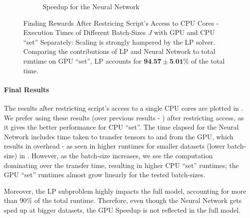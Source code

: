\begin{figure}[!htbp]
\begin{subfigure}{0.4\textwidth}
\begin{tikzpicture}
        \end{tikzpicture}
        \caption{Speedup for the Neural Network}
        \label{fig:Restricted Finding Rewards - Speedup for the Neural Network}
    \end{subfigure}
    \caption[Finding Rewards After Restricing Script's Access to CPU Cores - Execution Times of Different Batch-Sizes $J$ with GPU and CPU ``set'' Separately]{Finding Rewards After Restricing Script's Access to CPU Cores - Execution Times of Different Batch-Sizes $J$ with GPU and CPU ``set'' Separately: Scaling is strongly hampered by the LP solver. Comparing the contributions of LP and Neural Network to total runtime on GPU ``set'', LP accounts for $\textbf{94.57}\pm\textbf{5.01}\%$ of the total time.}
    \label{fig:Restricted Finding Rewards - Execution Times of Different Batch-Sizes J with GPU and CPUa ``set'' Separately}
\end{figure}

\paragraph{Final Results} The results after restricting script's access to a single CPU cores are plotted in . We prefer using these results (over previous results - ) after restricting access, as it gives the better performance for CPU ``set''. The time elapsed for the Neural Network includes time taken to transfer tensors to and from the GPU, which results in overhead - as seen in higher runtimes for smaller datasets (lower batch-size) in . However, as the batch-size increases, we see the computation dominating over the transfer time, resulting in higher CPU ``set'' runtimes; the GPU ``set'' runtimes almost grow linearly for the tested batch-sizes.

Moreover, the LP subproblem highly impacts the full model, accounting for more than $90\%$ of the total runtime. Therefore, even though the Neural Network gets sped up at bigger datasets, the GPU Speedup is not reflected in the full model.
